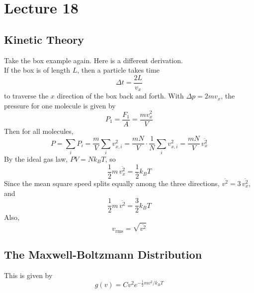 \documentclass{report}
\numberwithin{equation}{section}
\begin{document}
\section{Lecture 18}
\subsection{Kinetic Theory}
Take the box example again. Here is a different derivation.\\

\noindent If the box is of length $L$, then a particle takes time
\begin{equation}
    \Delta t = \frac{2L}{v_x}
\end{equation}
to traverse the $x$ direction of the box back and forth. With $\Delta p = 2mv_x$, the pressure for one molecule is given by
\begin{equation}
    P_1 = \frac{F_1}{A} = \frac{mv_x^2}{V}
\end{equation}
Then for all molecules,
\begin{equation}
    P = \sum_i P_i = \frac{m}{V}\sum_i v_{x,i}^2 = \frac{mN}{V}\cdot\frac{1}{N}\sum_i v_{x,i}^2 = \frac{mN}{V}\,\overline{v_x^2}
\end{equation}
By the ideal gas law, $PV = Nk_BT$, so
\begin{equation}
    \frac{1}{2}m\,\overline{v_x^2} = \frac{1}{2}k_BT
\end{equation}
Since the mean square speed splits equally among the three directions, $\overline{v^2} = 3\,\overline{v_x^2}$, and
\begin{equation}
    \frac{1}{2}m\,\overline{v^2} = \frac{3}{2}k_BT
\end{equation}
Also,
\begin{equation}
    v_{\text{rms}} = \sqrt{\overline{v^2}}
\end{equation}
\subsection{The Maxwell-Boltzmann Distribution}
This is given by
\begin{equation}
    g(v) = Cv^2e^{-\frac{1}{2}mv^2/k_BT}
\end{equation}
\end{document}
